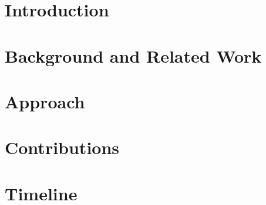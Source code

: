 \documentclass{article}
\author{
    Lillian Tsai\\
    Massachusetts Institute of Technology\\
    \texttt{tsilyai@mit.edu}
}
\date{\mydate}
\title{\mytitle}
\begin{document}


\newpage

\maketitle

\section{Introduction}%


\section{Background and Related Work}%


\section{Approach}%


\section{Contributions}%


\section{Timeline}%


\begin{spacing}{1}
{}

\end{spacing}
%
%


\end{document}
